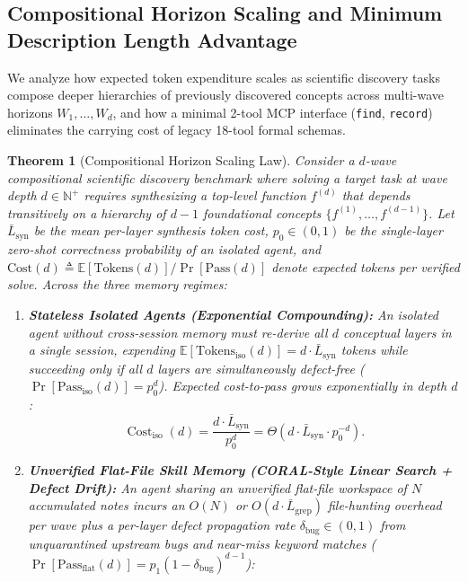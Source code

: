 \documentclass[10pt,twocolumn]{article}
\newtheorem{theorem}{Theorem}
\begin{document}
\subsection{Compositional Horizon Scaling and Minimum Description Length Advantage}

We analyze how expected token expenditure scales as scientific discovery tasks compose deeper hierarchies of previously discovered concepts across multi-wave horizons $W_1, \dots, W_d$, and how a minimal 2-tool MCP interface (\texttt{find}, \texttt{record}) eliminates the carrying cost of legacy 18-tool formal schemas.

\begin{theorem}[Compositional Horizon Scaling Law]
\label{thm:horizon_scaling}
Consider a $d$-wave compositional scientific discovery benchmark where solving a target task at wave depth $d \in \mathbb{N}^+$ requires synthesizing a top-level function $f^{(d)}$ that depends transitively on a hierarchy of $d-1$ foundational concepts $\{f^{(1)}, \dots, f^{(d-1)}\}$. Let $\bar{L}_{\text{syn}}$ be the mean per-layer synthesis token cost, $p_0 \in (0, 1)$ be the single-layer zero-shot correctness probability of an isolated agent, and $\text{Cost}(d) \triangleq \mathbb{E}[\text{Tokens}(d)] / \Pr[\text{Pass}(d)]$ denote expected tokens per verified solve. Across the three memory regimes:
\begin{enumerate}
    \item \textbf{Stateless Isolated Agents (Exponential Compounding):} An isolated agent without cross-session memory must re-derive all $d$ conceptual layers in a single session, expending $\mathbb{E}[\text{Tokens}_{\text{iso}}(d)] = d \cdot \bar{L}_{\text{syn}}$ tokens while succeeding only if all $d$ layers are simultaneously defect-free ($\Pr[\text{Pass}_{\text{iso}}(d)] = p_0^d$). Expected cost-to-pass grows exponentially in depth $d$:
    \begin{equation}
        \operatorname{Cost}_{\text{iso}}(d) = \frac{d \cdot \bar{L}_{\text{syn}}}{p_0^d} = \Theta\!\left(d \cdot \bar{L}_{\text{syn}} \cdot p_0^{-d}\right).
        \label{eq:cost_isolated}
    \end{equation}
    \item \textbf{Unverified Flat-File Skill Memory (\textsc{CORAL}-Style Linear Search + Defect Drift):} An agent sharing an unverified flat-file workspace of $N$ accumulated notes incurs an $O(N)$ or $O(d \cdot \bar{L}_{\text{grep}})$ file-hunting overhead per wave plus a per-layer defect propagation rate $\delta_{\text{bug}} \in (0, 1)$ from unquarantined upstream bugs and near-miss keyword matches ($\Pr[\text{Pass}_{\text{flat}}(d)] = p_1 (1 - \delta_{\text{bug}})^{d-1}$):

\end{enumerate}
\end{theorem}
\end{document}
